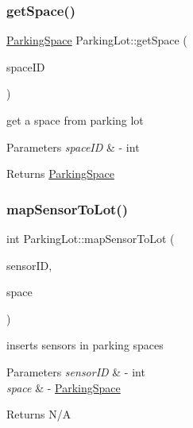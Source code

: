 \mbox{\label{class_parking_lot_ae9420690a078541084aa1fcb35f644fc}} 
\subsubsection{\texorpdfstring{get\+Space()}{getSpace()}\hspace{0.1cm}{\footnotesize\ttfamily [2/2]}}
{\footnotesize\ttfamily \mbox{\hyperlink{class_parking_space}{Parking\+Space}} Parking\+Lot\+::get\+Space (\begin{DoxyParamCaption}\item[{int}]{space\+ID }\end{DoxyParamCaption})}



get a space from parking lot 


\begin{DoxyParams}{Parameters}
{\em space\+ID} & -\/ int \\
\hline
\end{DoxyParams}
\begin{DoxyReturn}{Returns}
\mbox{\hyperlink{class_parking_space}{Parking\+Space}} 
\end{DoxyReturn}
\mbox{\label{class_parking_lot_a7d749c2ac49c9e84d33b21d29a288ebf}} 
\subsubsection{\texorpdfstring{map\+Sensor\+To\+Lot()}{mapSensorToLot()}\hspace{0.1cm}{\footnotesize\ttfamily [1/2]}}
{\footnotesize\ttfamily int Parking\+Lot\+::map\+Sensor\+To\+Lot (\begin{DoxyParamCaption}\item[{int}]{sensor\+ID,  }\item[{\mbox{\hyperlink{class_parking_space}{Parking\+Space}} $\ast$}]{space }\end{DoxyParamCaption})}



inserts sensors in parking spaces 


\begin{DoxyParams}{Parameters}
{\em sensor\+ID} & -\/ int \\
\hline
{\em space} & -\/ \mbox{\hyperlink{class_parking_space}{Parking\+Space}} \\
\hline
\end{DoxyParams}
\begin{DoxyReturn}{Returns}
N/A 
\end{DoxyReturn}
\mbox{\label{class_parking_lot_a3ad5598c96642089744b786bd131f308}} 
